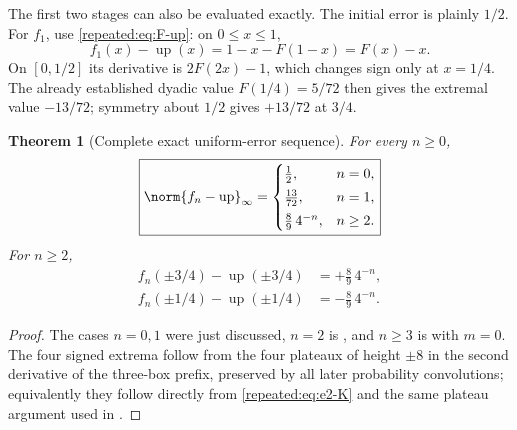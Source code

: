 \documentclass[11pt,oneside]{article}
\newtheorem{theorem}{Theorem}[section]
\theoremstyle{definition}
\theoremstyle{remark}
\newcommand{\Up}{\operatorname{up}}
\begin{document}
The first two stages can also be evaluated exactly.  The initial error is plainly $1/2$.  For
$f_1$, use \eqref{repeated:eq:F-up}: on $0\le x\le1$,
\begin{equation}
 f_1(x)-\Up(x)=1-x-F(1-x)=F(x)-x.                          \label{repeated:eq:e1-F}
\end{equation}
On $[0,1/2]$ its derivative is $2F(2x)-1$, which changes sign only at $x=1/4$.  The already
established dyadic value $F(1/4)=5/72$ then gives the extremal value $-13/72$; symmetry about
$1/2$ gives $+13/72$ at $3/4$.

\begin{theorem}[Complete exact uniform-error sequence]
\label{repeated:thm:complete-error}
For every $n\ge0$,
\begin{equation}
 \boxed{\displaystyle
 \norm{f_n-\Up}_\infty=
 \begin{cases}
  \frac12,&n=0,\\[0.25em]
  \frac{13}{72},&n=1,\\[0.25em]
  \frac89\,4^{-n},&n\ge2.
 \end{cases}}                                              \label{repeated:eq:complete-error}
\end{equation}
For $n\ge2$,
\begin{equation}
 \begin{aligned}
 f_n(\pm3/4)-\Up(\pm3/4)&=+\frac89\,4^{-n},\\
 f_n(\pm1/4)-\Up(\pm1/4)&=-\frac89\,4^{-n}.
 \end{aligned}                                             \label{repeated:eq:four-extrema}
\end{equation}
\end{theorem}

\begin{proof}
The cases $n=0,1$ were just discussed, $n=2$ is , and $n\ge3$ is
 with $m=0$.  The four signed extrema follow from the four plateaux
of height $\pm8$ in the second derivative of the three-box prefix, preserved by all later
probability convolutions; equivalently they follow directly from \eqref{repeated:eq:e2-K} and the same
plateau argument used in .
\end{proof}
\end{document}
